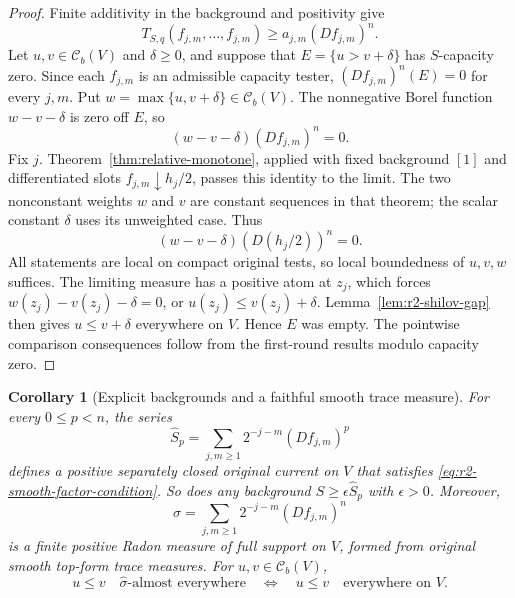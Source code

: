 \documentclass[11pt,a4paper]{article}
\numberwithin{equation}{section}
\newtheorem{corollary}[theorem]{Corollary}
\theoremstyle{definition}
\theoremstyle{remark}
\newcommand{\Cb}{\mathcal C_b}
\begin{document}
\begin{proof}
Finite additivity in the background and positivity give
\[
 T_{S,q}(f_{j,m},\ldots,f_{j,m})
       \geq a_{j,m}(Df_{j,m})^n.
\]
Let $u,v\in\Cb(V)$ and $\delta\geq0$, and suppose that
$E=\{u>v+\delta\}$ has $S$-capacity zero. Since each $f_{j,m}$ is an
admissible capacity tester, $(Df_{j,m})^n(E)=0$ for every $j,m$.
Put $w=\max\{u,v+\delta\}\in\Cb(V)$. The nonnegative Borel
function $w-v-\delta$ is zero off $E$, so
\[
 (w-v-\delta)(Df_{j,m})^n=0.
\]
Fix $j$. Theorem~\ref{thm:relative-monotone}, applied with fixed
background $[1]$ and differentiated slots $f_{j,m}\downarrow h_j/2$,
passes this identity to the limit. The two nonconstant weights $w$
and $v$ are constant sequences in that theorem; the scalar constant
$\delta$ uses its unweighted case. Thus
\[
 (w-v-\delta)(D(h_j/2))^n=0.
\]
All statements are local on compact original tests, so local
boundedness of $u,v,w$ suffices. The limiting measure has a positive
atom at $z_j$, which forces
$w(z_j)-v(z_j)-\delta=0$, or $u(z_j)\leq v(z_j)+\delta$.
Lemma~\ref{lem:r2-shilov-gap} then gives $u\leq v+\delta$ everywhere
on $V$. Hence $E$ was empty. The pointwise comparison consequences
follow from the first-round results modulo capacity zero.
\end{proof}

\begin{corollary}[Explicit backgrounds and a faithful smooth trace measure]
\label{cor:r2-smooth-factor-backgrounds}
For every $0\leq p<n$, the series
\[
 \widehat S_p=\sum_{j,m\geq1}2^{-j-m}(Df_{j,m})^p
\]
defines a positive separately closed original current on $V$ that
satisfies \eqref{eq:r2-smooth-factor-condition}. So does any
background $S\geq\epsilon\widehat S_p$ with $\epsilon>0$.
Moreover,
\[
 \widehat\sigma=\sum_{j,m\geq1}2^{-j-m}(Df_{j,m})^n
\]
is a finite positive Radon measure of full support on $V$, formed from
original smooth top-form trace measures. For $u,v\in\Cb(V)$,
\[
 u\leq v\quad\widehat\sigma\text{-almost everywhere}
 \quad\Longleftrightarrow\quad u\leq v\quad\text{everywhere on }V.
\]
\end{corollary}
\end{document}
